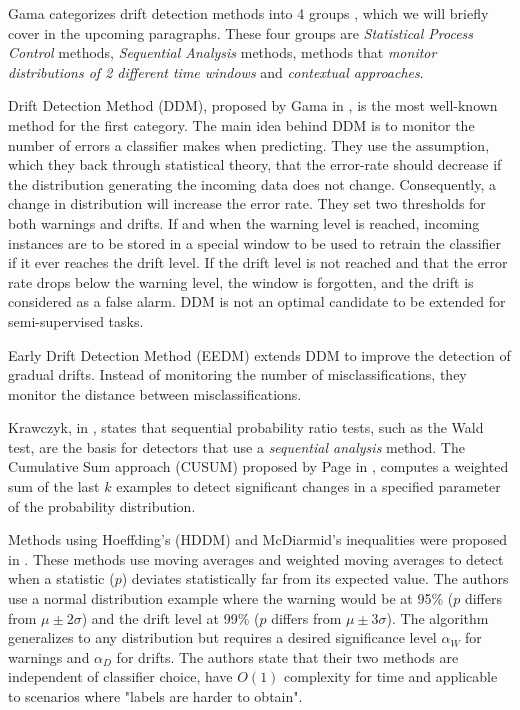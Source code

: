 Gama categorizes drift detection methods into 4 groups \cite{Gama:2014:SCD:2597757.2523813}, which we will briefly cover in the upcoming paragraphs. These four groups are \textit{Statistical Process Control} methods, \textit{Sequential Analysis} methods, methods that \textit{monitor distributions of 2 different time windows} and \textit{contextual approaches}.

Drift Detection Method (DDM), proposed by Gama in \cite{gama2004learning}, is the most well-known method for the first category. The main idea behind DDM is to monitor the number of errors a classifier makes when predicting. They use the assumption, which they back through statistical theory, that the error-rate should decrease if the distribution generating the incoming data does not change. Consequently, a change in distribution will increase the error rate. They set two thresholds for both warnings and drifts. If and when the warning level is reached, incoming instances are to be stored in a special window to be used to retrain the classifier if it ever reaches the drift level. If the drift level is not reached and that the error rate drops below the warning level, the window is forgotten, and the drift is considered as a false alarm. DDM is not an optimal candidate to be extended for semi-supervised tasks.

Early Drift Detection Method (EEDM) \cite{baena2006early} extends DDM to improve the detection of gradual drifts. Instead of monitoring the number of misclassifications, they monitor the distance between misclassifications.

Krawczyk, in \cite{KRAWCZYK2017132}, states that sequential probability ratio tests, such as the Wald test, are the basis for detectors that use a \textit{sequential analysis} method.
The Cumulative Sum approach (CUSUM) proposed by Page in \cite{page1954continuous}, computes a weighted sum of the last $k$ examples to detect significant changes in a specified parameter of the probability distribution.

Methods using Hoeffding's (HDDM) and McDiarmid's inequalities were proposed in \cite{frias2015online}. These methods use moving averages and weighted moving averages to detect when a statistic ($p$) deviates statistically far from its expected value. The authors use a normal distribution example where the warning would be at 95\% ($p$ differs from $\mu\pm 2\sigma$) and the drift level at 99\% ($p$ differs from $\mu\pm 3\sigma$). The algorithm generalizes to any distribution but requires a desired significance level $\alpha_W$ for warnings and $\alpha_D$ for drifts. The authors state that their two methods are independent of classifier choice, have $O(1)$ complexity for time and applicable to scenarios where "labels are harder to obtain". 

